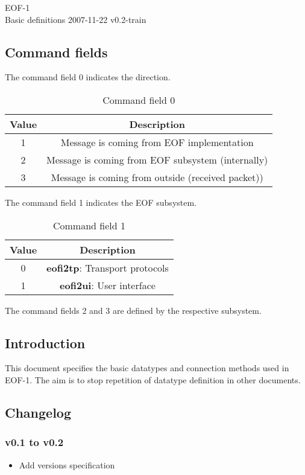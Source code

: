 \documentclass[12pt,a4paper]{book}
\begin{document}
EOF-1\\Basic definitions
2007-11-22 v0.2-train
\subsection{Command fields}
The command field 0 indicates the direction.
\begin{longtable}{|c|c|}
\caption{Command field 0}\\
\hline
\textbf{Value} & \textbf{Description}\\
\hline
1 & Message is coming from EOF implementation\\
\hline
2 & Message is coming from EOF subsystem (internally)\\
\hline
3 & Message is coming from outside (received packet))\\
\hline
\end{longtable}

The command field 1 indicates the EOF subsystem.
\begin{longtable}{|c|c|}
\caption{Command field 1}\\
\hline
\textbf{Value} & \textbf{Description}\\
\hline
0 & \textbf{eofi2tp}: Transport protocols\\
\hline
1 & \textbf{eofi2ui}: User interface\\
\hline
\end{longtable}

The command fields 2 and 3 are defined by the respective subsystem.
\subsection{Introduction}
This document specifies the basic datatypes and connection
methods used in EOF-1. The aim is to stop repetition of
datatype definition in other documents.

\subsection{Changelog}
\subsubsection{v0.1 to v0.2}
\begin{itemize}
\item Add versions specification
\end{itemize}
\end{document}

